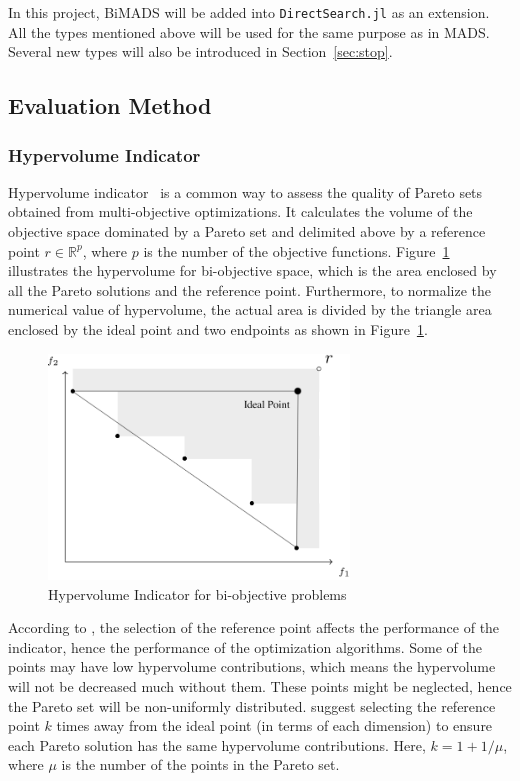 \documentclass[11pt,oneside,onecolumn,openright]{article}
\begin{document}
   In this project, BiMADS will be added into \verb|DirectSearch.jl| as an extension. All the types mentioned above will be used for the same purpose as in MADS. Several new types will also be introduced in Section~\ref{sec:stop}.

  \subsection{Evaluation Method}
  \subsubsection*{Hypervolume Indicator}
  Hypervolume indicator~\cite{zitzler1998multiobjective} is a common way to assess the quality of Pareto sets obtained from multi-objective optimizations. It calculates the volume of the objective space dominated by a Pareto set and delimited above by a reference point $r\in \mathbb{R}^p$, where $p$ is the number of the objective functions. Figure~\ref{fig:hv} illustrates the hypervolume for bi-objective space, which is the area enclosed by all the Pareto solutions and the reference point. Furthermore, to normalize the numerical value of hypervolume, the actual area is divided by the triangle area enclosed by the ideal point and two endpoints as shown in Figure~\ref{fig:hv}.
  \begin{figure}[t]
  \centering
  \includegraphics[width=8cm]{fig/hv_eg.png}
  \caption{Hypervolume Indicator for bi-objective problems~\cite{bigeon2021dmulti}}
  \label{fig:hv}
  \end{figure}
  According to \cite{ishibuchi2018specify}, the selection of the reference point affects the performance of the indicator, hence the performance of the optimization algorithms. Some of the points may have low hypervolume contributions, which means the hypervolume will not be decreased much without them. These points might be neglected, hence the Pareto set will be non-uniformly distributed. \cite{ishibuchi2018specify} suggest selecting the reference point $k$ times away from the ideal point (in terms of each dimension) to ensure each Pareto solution has the same hypervolume contributions. Here, $k=1+1/\mu$, where $\mu$ is the number of the points in the Pareto set.
\end{document}
